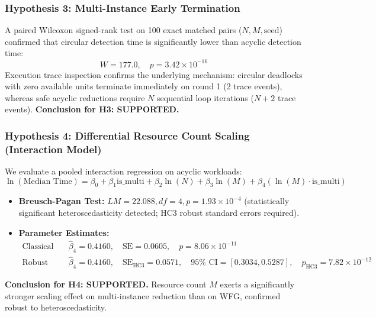 \documentclass[11pt,a4paper]{article}
\begin{document}
\subsubsection{Hypothesis 3: Multi-Instance Early Termination}
A paired Wilcoxon signed-rank test on 100 exact matched pairs ($N, M, \text{seed}$) confirmed that circular detection time is significantly lower than acyclic detection time:
\begin{equation}
    W = 177.0, \quad p = 3.42 \times 10^{-16}
\end{equation}
Execution trace inspection confirms the underlying mechanism: circular deadlocks with zero available units terminate immediately on round 1 (2 trace events), whereas safe acyclic reductions require $N$ sequential loop iterations ($N + 2$ trace events).  
\textbf{Conclusion for H3: SUPPORTED.}

\subsubsection{Hypothesis 4: Differential Resource Count Scaling (Interaction Model)}
We evaluate a pooled interaction regression on acyclic workloads:
\begin{equation}
    \ln(\text{Median Time}) = \beta_0 + \beta_1 \text{is\_multi} + \beta_2 \ln(N) + \beta_3 \ln(M) + \beta_4 (\ln(M) \cdot \text{is\_multi})
\end{equation}
\begin{itemize}
    \item \textbf{Breusch-Pagan Test:} $LM = 22.088, df = 4, p = 1.93 \times 10^{-4}$ (statistically significant heteroscedasticity detected; HC3 robust standard errors required).
    \item \textbf{Parameter Estimates:}
    \begin{align}
        \text{Classical OLS:} \quad &\hat{\beta}_4 = 0.4160, \quad \text{SE} = 0.0605, \quad p = 8.06 \times 10^{-11} \\
        \text{Robust HC3:} \quad &\hat{\beta}_4 = 0.4160, \quad \text{SE}_{\text{HC3}} = 0.0571, \quad 95\%\text{ CI} = [0.3034, 0.5287], \quad p_{\text{HC3}} = 7.82 \times 10^{-12}
    \end{align}
\end{itemize}
\textbf{Conclusion for H4: SUPPORTED.} Resource count $M$ exerts a significantly stronger scaling effect on multi-instance reduction than on WFG, confirmed robust to heteroscedasticity.

\end{document}
